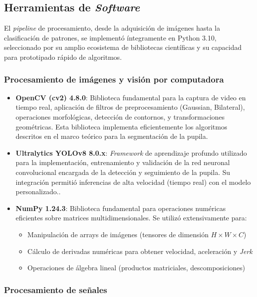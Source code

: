 \subsection{Herramientas de \textit{Software}}

El \textit{pipeline} de procesamiento, desde la adquisición de imágenes hasta la clasificación de patrones, se implementó íntegramente en Python 3.10, seleccionado por su amplio ecosistema de bibliotecas científicas y su capacidad para prototipado rápido de algoritmos.

\subsubsection{Procesamiento de imágenes y visión por computadora}

\begin{itemize}
	\item \textbf{OpenCV (cv2) 4.8.0}: Biblioteca fundamental para la captura de video en tiempo real, aplicación de filtros de preprocesamiento (Gaussian, Bilateral), operaciones morfológicas, detección de contornos, y transformaciones geométricas.
	Esta biblioteca implementa eficientemente los algoritmos descritos en el marco teórico para la segmentación de la pupila.
	\item \textbf{Ultralytics YOLOv8 8.0.x}: \textit{Framework} de aprendizaje profundo utilizado para la implementación, entrenamiento y validación de la red neuronal convolucional encargada de la detección y seguimiento de la pupila.
	Su integración permitió inferencias de alta velocidad (tiempo real) con el modelo personalizado.\cite{jocher_yolov8_2023}.
	\item \textbf{NumPy 1.24.3}: Biblioteca fundamental para operaciones numéricas eficientes sobre matrices multidimensionales.
	Se utilizó extensivamente para:
	\begin{itemize}
		\item Manipulación de arrays de imágenes (tensores de dimensión $H \times W \times C$)
		\item Cálculo de derivadas numéricas para obtener velocidad, aceleración y \textit{Jerk}
		\item Operaciones de álgebra lineal (productos matriciales, descomposiciones)
	\end{itemize}
\end{itemize}

\subsubsection{Procesamiento de señales}

